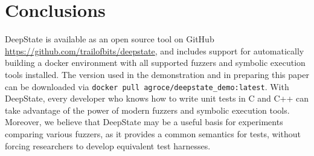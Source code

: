 \documentclass[sigconf]{acmart}
\begin{document}
\section{Conclusions}

DeepState is available as an open source tool on GitHub \url{https://github.com/trailofbits/deepstate}, and includes support for automatically building a docker environment with all supported fuzzers and symbolic execution tools installed.  The version used in the demonstration and in preparing this paper can be downloaded via {\tt docker pull agroce/deepstate\_demo:latest}.  With DeepState, every developer who knows how to write unit tests in C and C++ can take advantage of the power of modern fuzzers and symbolic execution tools.  Moreover, we believe that DeepState may be a useful basis for experiments comparing various fuzzers, as it provides a common semantics for tests, without forcing researchers to develop equivalent test harnesses.



\end{document}
